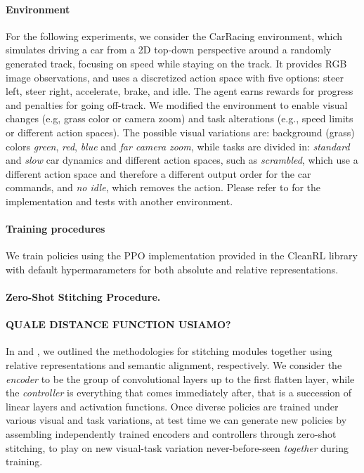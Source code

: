 \paragraph{Environment}
For the following experiments, we consider the CarRacing \citep{klimov2016carracing} environment, which simulates driving a car from a 2D top-down perspective around a randomly generated track, focusing on speed while staying on the track. It provides RGB image observations, and uses a discretized action space with five options: steer left, steer right, accelerate, brake, and idle. The agent earns rewards for progress and penalties for going off-track. We modified the environment to enable visual changes (e.g, grass color or camera zoom) and task alterations (e.g., speed limits or different action spaces).
The possible visual variations are: background (grass) colors \textit{green}, \textit{red}, \textit{blue} and \textit{far camera zoom}, while tasks are divided in: \textit{standard} and \textit{slow} car dynamics and different action spaces, such as \textit{scrambled}, which use a different action space and therefore a different output order for the car commands, and \textit{no idle}, which removes the  action.
Please refer to  for the implementation and tests with another environment.

\paragraph{Training procedures}
We train policies using the PPO implementation provided in the CleanRL library \citep{huang2022cleanrl} with default hypermarameters for both absolute and relative representations.

\paragraph{Zero-Shot Stitching Procedure.}
\paragraph{QUALE DISTANCE FUNCTION USIAMO?}
In  and , we outlined the methodologies for stitching modules together using relative representations and semantic alignment, respectively. 
We consider the \textit{encoder} to be the group of convolutional layers up to the first flatten layer, while the \textit{controller} is everything that comes immediately after, that is a succession of linear layers and activation functions.
Once diverse policies are trained under various visual and task variations, at test time we can generate new policies by assembling independently trained encoders and controllers through zero-shot stitching, to play on new visual-task variation never-before-seen \textit{together} during training.

